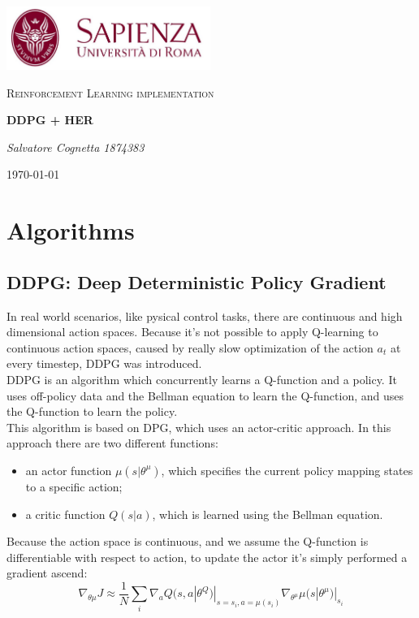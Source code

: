 \documentclass[12pt]{report}
\begin{document}
\begin{titlepage}
    \centering
	\includegraphics[width=0.5\textwidth]{cherubino.jpg}\par\vspace{1cm}
	\vspace{1cm}
	{\scshape\Large Reinforcement Learning implementation\par}
	\vspace{1.5cm}
	{\huge\bfseries DDPG + HER\par}
	\vspace{2cm}
	{\Large\itshape Salvatore Cognetta 1874383\par}
	\vfill    
    
	{\large \today\par}
\end{titlepage}

\newpage
\tableofcontents
\newpage

\chapter{Algorithms}
\section{DDPG: Deep Deterministic Policy Gradient}
In real world scenarios, like pysical control tasks, there are continuous and high dimensional action spaces. Because it's not possible to apply Q-learning to continuous action spaces, caused by really slow optimization of the action $a_t$ at every timestep, DDPG was introduced.\\ 
DDPG is an algorithm which concurrently learns a Q-function and a policy. It uses off-policy data and the Bellman equation to learn the Q-function, and uses the Q-function to learn the policy.\\
This algorithm is based on DPG, which uses an actor-critic approach. In this approach there are two different functions: 
\begin{itemize}
	\item an actor function $\mu(s|\theta^\mu)$, which specifies the current policy mapping states to a specific action;
	\item a critic function $Q(s|a)$, which is learned using the Bellman equation.
\end{itemize}
Because the action space is continuous, and we assume the Q-function is differentiable with respect to action, to update the actor it's simply performed a gradient ascend:
\[
	\nabla_{\theta\mu}J \approx \frac{1}{N} \sum_i \nabla_a Q(s,a|\theta^Q)|_{s=s_i, a=\mu(s_i)} \nabla_{\theta^\mu}\mu(s|\theta^\mu)|_{s_i}
\]
\end{document}
